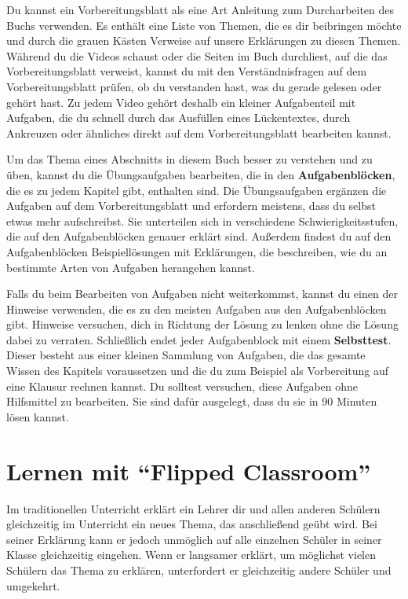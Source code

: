 \documentclass[../main.tex]{subfiles}
\begin{document}
Du kannst ein Vorbereitungsblatt als eine Art Anleitung zum Durcharbeiten des Buchs verwenden. Es enthält eine Liste von Themen, die es dir beibringen möchte und durch die grauen Kästen Verweise auf unsere Erklärungen zu diesen Themen. Während du die Videos schaust oder die Seiten im Buch durchliest, auf die das Vorbereitungsblatt verweist, kannst du mit den Verständnisfragen auf dem Vorbereitungsblatt prüfen, ob du verstanden hast, was du gerade gelesen oder gehört hast. Zu jedem Video gehört deshalb ein kleiner Aufgabenteil mit Aufgaben, die du schnell durch das Ausfüllen eines Lückentextes, durch Ankreuzen oder ähnliches direkt auf dem Vorbereitungsblatt bearbeiten kannst.

Um das Thema eines Abschnitts in diesem Buch besser zu verstehen und zu üben, kannst du die Übungsaufgaben bearbeiten, die in den \textbf{Aufgabenblöcken}, die es zu jedem Kapitel gibt, enthalten sind. Die Übungsaufgaben ergänzen die Aufgaben auf dem Vorbereitungsblatt und erfordern meistens, dass du selbst etwas mehr aufschreibst. Sie unterteilen sich in verschiedene Schwierigkeitsstufen, die auf den Aufgabenblöcken genauer erklärt sind. Außerdem findest du auf den Aufgabenblöcken Beispiellösungen mit Erklärungen, die beschreiben, wie du an bestimmte Arten von Aufgaben herangehen kannst.

Falls du beim Bearbeiten von Aufgaben nicht weiterkommst, kannst du einen der Hinweise verwenden, die es zu den meisten Aufgaben aus den Aufgabenblöcken gibt. Hinweise versuchen, dich in Richtung der Lösung zu lenken ohne die Lösung dabei zu verraten. Schließlich endet jeder Aufgabenblock mit einem \textbf{Selbsttest}. Dieser besteht aus einer kleinen Sammlung von Aufgaben, die das gesamte Wissen des Kapitels voraussetzen und die du zum Beispiel als Vorbereitung auf eine Klausur rechnen kannst. Du solltest versuchen, diese Aufgaben ohne Hilfsmittel zu bearbeiten. Sie sind dafür ausgelegt, dass du sie in 90 Minuten lösen kannst.

\newpage
\section*{Lernen mit \enquote{Flipped Classroom}}
Im traditionellen Unterricht erklärt ein Lehrer dir und allen anderen Schülern gleichzeitig im Unterricht ein neues Thema, das anschließend geübt wird. Bei seiner Erklärung kann er jedoch unmöglich auf alle einzelnen Schüler in seiner Klasse gleichzeitig eingehen. Wenn er langsamer erklärt, um möglichst vielen Schülern das Thema zu erklären, unterfordert er gleichzeitig andere Schüler und umgekehrt.
\end{document}
